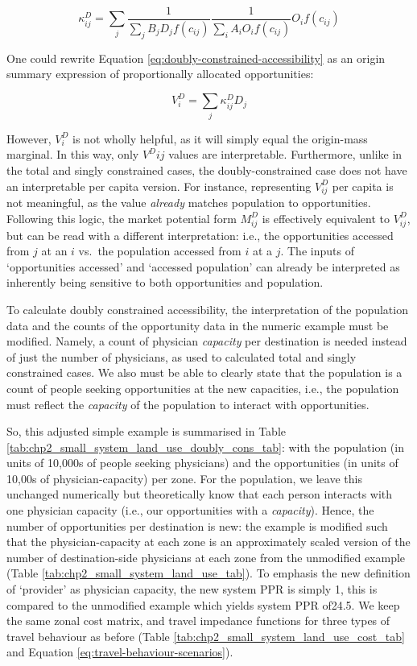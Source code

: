 \documentclass[
11pt, %
oneside, %
english, %
singlespacing, %
]{macthesis} %
\begin{document}
\[
\kappa_{ij}^D = \sum_j \frac{1}{\sum_j B_j D_j f(c_{ij})} \frac{1}{\sum_i A_i O_i f(c_{ij})} O_i f(c_{ij})
\]

One could rewrite Equation \ref{eq:doubly-constrained-accessibility} as an origin summary expression of proportionally allocated opportunities:

\begin{equation}
\label{eq:doubly-constrained-accessibility-w-paf}
V^D_{i} = \sum_j \kappa^D_{ij}  D_j
\end{equation} 

However, \(V^D_{i}\) is not wholly helpful, as it will simply equal the origin-mass marginal. In this way, only \(V^D{ij}\) values are interpretable. Furthermore, unlike in the total and singly constrained cases, the doubly-constrained case does not have an interpretable per capita version. For instance, representing \(V_{ij}^D\) per capita is not meaningful, as the value \emph{already} matches population to opportunities. Following this logic, the market potential form \(M^D_{ij}\) is effectively equivalent to \(V_{ij}^D\), but can be read with a different interpretation: i.e., the opportunities accessed from \(j\) at an \(i\) vs.~the population accessed from \(i\) at a \(j\). The inputs of `opportunities accessed' and `accessed population' can already be interpreted as inherently being sensitive to both opportunities and population.

To calculate doubly constrained accessibility, the interpretation of the population data and the counts of the opportunity data in the numeric example must be modified. Namely, a count of physician \emph{capacity} per destination is needed instead of just the number of physicians, as used to calculated total and singly constrained cases. We also must be able to clearly state that the population is a count of people seeking opportunities at the new capacities, i.e., the population must reflect the \emph{capacity} of the population to interact with opportunities.

So, this adjusted simple example is summarised in Table \ref{tab:chp2_small_system_land_use_doubly_cons_tab}: with the population (in units of 10,000s of people seeking physicians) and the opportunities (in units of 10,00s of physician-capacity) per zone. For the population, we leave this unchanged numerically but theoretically know that each person interacts with one physician capacity (i.e., our opportunities with a \emph{capacity}). Hence, the number of opportunities per destination is new: the example is modified such that the physician-capacity at each zone is an approximately scaled version of the number of destination-side physicians at each zone from the unmodified example (Table \ref{tab:chp2_small_system_land_use_tab}). To emphasis the new definition of `provider' as physician capacity, the new system PPR is simply 1, this is compared to the unmodified example which yields system PPR of24.5. We keep the same zonal cost matrix, and travel impedance functions for three types of travel behaviour as before (Table \ref {tab:chp2_small_system_land_use_cost_tab} and Equation \ref{eq:travel-behaviour-scenarios}).
\end{document}
